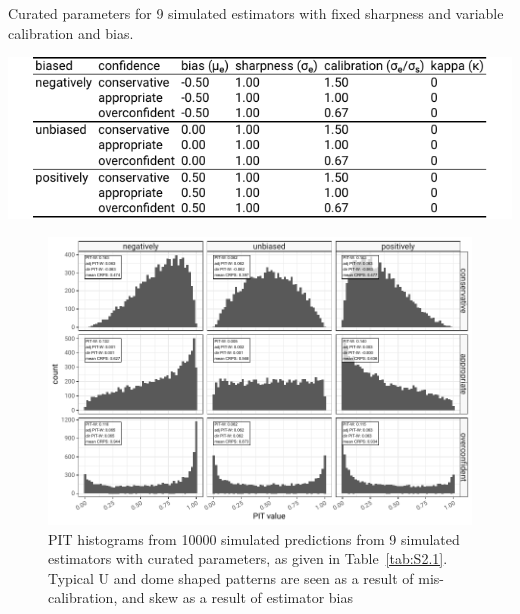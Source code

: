 \documentclass[a4paper, 12pt, twoside]{article}
\begin{document}
\begin{table}[ht!]
\centering
\caption{Curated parameters for 9 simulated estimators with fixed sharpness and variable calibration and bias.}
  \includegraphics{fig/tab1-params}
\label{tab:S2.1}
\end{table}

\begin{figure}[ht!]
\centering
\includegraphics{fig/fig2-pit-histograms}
\caption{PIT histograms from 10000 simulated predictions from 9 simulated estimators with curated parameters, as given in Table~\ref{tab:S2.1}. Typical U and dome shaped patterns are seen as a result of mis-calibration, and skew as a result of estimator bias}
\label{fig:S2.2}
\end{figure}
\end{document}
